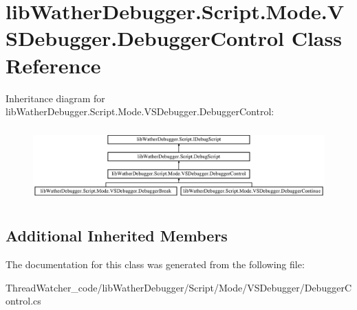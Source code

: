 \hypertarget{classlib_wather_debugger_1_1_script_1_1_mode_1_1_v_s_debugger_1_1_debugger_control}{\section{lib\+Wather\+Debugger.\+Script.\+Mode.\+V\+S\+Debugger.\+Debugger\+Control Class Reference}
\label{classlib_wather_debugger_1_1_script_1_1_mode_1_1_v_s_debugger_1_1_debugger_control}
}
Inheritance diagram for lib\+Wather\+Debugger.\+Script.\+Mode.\+V\+S\+Debugger.\+Debugger\+Control\+:\begin{figure}[H]
\begin{center}
\leavevmode
\includegraphics[height=2.879177cm]{classlib_wather_debugger_1_1_script_1_1_mode_1_1_v_s_debugger_1_1_debugger_control}
\end{center}
\end{figure}
\subsection*{Additional Inherited Members}


The documentation for this class was generated from the following file\+:\begin{DoxyCompactItemize}
\item 
Thread\+Watcher\+\_\+code/lib\+Wather\+Debugger/\+Script/\+Mode/\+V\+S\+Debugger/Debugger\+Control.\+cs\end{DoxyCompactItemize}
